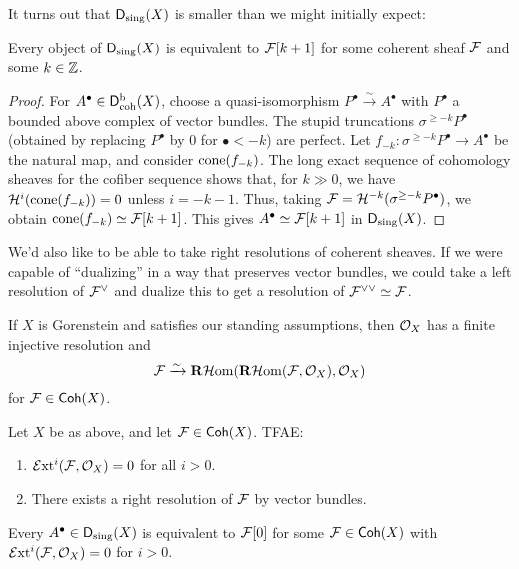 \documentclass{article}
\begin{document}
It turns out that $\mathsf{D}_{\mathrm{sing}}(X)$ is smaller than we might initially expect:

\begin{prop}
	Every object of $\mathsf{D}_{\mathrm{sing}}(X)$ is equivalent to $\mathcal{F}[k+1]$ for some coherent sheaf $\mathcal{F}$ and some $k \in \mathbb{Z}$.
\end{prop}

\begin{proof}
	For $A^\bullet \in \mathsf{D}^\mathrm{b}_{\mathrm{coh}}(X)$, choose a quasi-isomorphism $P^\bullet \xrightarrow{\sim} A^\bullet$ with $P^\bullet$ a bounded above complex of vector bundles.
	The stupid truncations $\sigma^{\geq -k} P^\bullet$ (obtained by replacing $P^\bullet$ by $0$ for $\bullet < -k$) are perfect.
	Let $f_{-k}: \sigma^{\geq -k} P^\bullet \to A^\bullet$ be the natural map, and consider $\operatorname{cone}(f_{-k})$.
	The long exact sequence of cohomology sheaves for the cofiber sequence shows that, for $k \gg 0$, we have $\mathcal{H}^i(\operatorname{cone}(f_{-k})) = 0$ unless $i = -k-1$.
	Thus, taking $\mathcal{F} = \mathcal{H}^{-k}(\sigma^{\geq -k} P^\bullet)$, we obtain $\operatorname{cone}(f_{-k}) \simeq \mathcal{F}[k+1]$.
	This gives $A^\bullet \simeq \mathcal{F}[k+1]$ in $\mathsf{D}_{\mathrm{sing}}(X)$.
\end{proof}

We'd also like to be able to take right resolutions of coherent sheaves.
If we were capable of ``dualizing'' in a way that preserves vector bundles, we could take a left resolution of $\mathcal{F}^\vee$ and dualize this to get a resolution of $\mathcal{F}^{\vee \vee} \simeq \mathcal{F}$.

If $X$ is Gorenstein and satisfies our standing assumptions, then $\mathcal{O}_X$ has a finite injective resolution and
\[
	\mathcal{F} \xrightarrow{\sim} \mathbf{R}\mathcal{H}\mkern-3mu\operatorname{om}(\mathbf{R}\mathcal{H}\mkern-3mu\operatorname{om}(\mathcal{F}, \mathcal{O}_X), \mathcal{O}_X)
\]
for $\mathcal{F} \in \mathsf{Coh}(X)$.

\begin{lem}
	Let $X$ be as above, and let $\mathcal{F} \in \mathsf{Coh}(X)$.
	TFAE:
	\begin{enumerate}
		\item $\mathcal{E}\mkern-3mu\operatorname{xt}^i(\mathcal{F}, \mathcal{O}_X) = 0$ for all $i > 0$.
		\item There exists a right resolution of $\mathcal{F}$ by vector bundles.
	\end{enumerate}
\end{lem}

\begin{cor}
	Every $A^\bullet \in \mathsf{D}_{\mathrm{sing}}(X)$ is equivalent to $\mathcal{F}[0]$ for some $\mathcal{F} \in \mathsf{Coh}(X)$ with $\mathcal{E}\mkern-3mu\operatorname{xt}^i(\mathcal{F}, \mathcal{O}_X) = 0$ for $i > 0$.
\end{cor}
\end{document}
